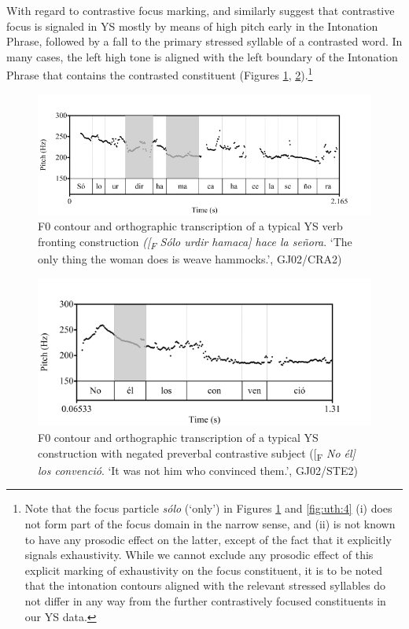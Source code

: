 \documentclass[output=paper]{langsci/langscibook}
\begin{document}
With regard to contrastive focus marking, \citet{Uth16} and \citet{GriceUth15} similarly suggest that contrastive focus is signaled in YS mostly by means of high pitch early in the Intonation Phrase, followed by a fall to the primary stressed syllable of a contrasted word. In many cases, the left high tone is aligned with the left boundary of the Intonation Phrase that contains the contrasted constituent (Figures \ref{fig:uth:2}, \ref{fig:uth:3}).\footnote{Note that the focus particle \textit{sólo} (‘only') in Figures \ref{fig:uth:2} and \ref{fig:uth:4} (i) does not form part of the focus domain in the narrow sense, and (ii) is not known to have any prosodic effect on the latter, except of the fact that it explicitly signals exhaustivity. While we cannot exclude any prosodic effect of this explicit marking of exhaustivity on the focus constituent, it is to be noted that the intonation contours aligned with the relevant stressed syllables do not differ in any way from the further contrastively focused constituents in our YS data.} 

\begin{figure}
\includegraphics[width=\textwidth]{figures/UTH-img24.png}
 \caption{F0 contour and orthographic transcription of a typical YS verb fronting construction
 \textit{([\textsubscript{F}} \textit{Sólo urdir hamaca] hace la señora}. 
 ‘The only thing the woman does is weave hammocks.’, GJ02/CRA2)}
\label{fig:uth:2}
\end{figure}

\begin{figure}
\includegraphics[width=\textwidth]{figures/UTH-img25.png}
 \caption{F0 contour and orthographic transcription of a typical YS construction with negated preverbal contrastive subject 
 ([\textsubscript{F} \textit{No él] los convenció}. 
 ‘It was not him who convinced them.’, GJ02/STE2)}
\label{fig:uth:3}
\end{figure}
\end{document}
